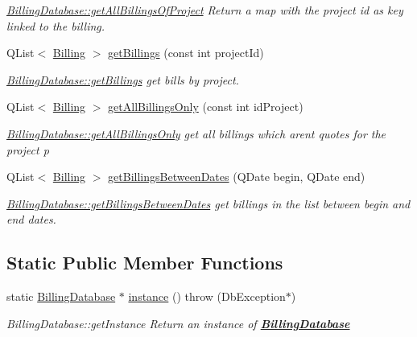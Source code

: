 \begin{DoxyCompactItemize}
\begin{DoxyCompactList}\small\item\em \hyperlink{classDatabases_1_1BillingDatabase_a44c3e09fbb7d540579f4cceae4d6901f}{Billing\+Database\+::get\+All\+Billings\+Of\+Project} Return a map with the project id as key linked to the billing. \end{DoxyCompactList}\item 
Q\+List$<$ \hyperlink{classModels_1_1Billing}{Billing} $>$ \hyperlink{classDatabases_1_1BillingDatabase_a0eb72e4dfee0ff38f2f4b795a16007c8}{get\+Billings} (const int project\+Id)
\begin{DoxyCompactList}\small\item\em \hyperlink{classDatabases_1_1BillingDatabase_a0eb72e4dfee0ff38f2f4b795a16007c8}{Billing\+Database\+::get\+Billings} get bills by project. \end{DoxyCompactList}\item 
Q\+List$<$ \hyperlink{classModels_1_1Billing}{Billing} $>$ \hyperlink{classDatabases_1_1BillingDatabase_ac42335646086c24b2adb6afc2829e07c}{get\+All\+Billings\+Only} (const int id\+Project)
\begin{DoxyCompactList}\small\item\em \hyperlink{classDatabases_1_1BillingDatabase_ac42335646086c24b2adb6afc2829e07c}{Billing\+Database\+::get\+All\+Billings\+Only} get all billings which aren\textquotesingle{}t quotes for the project {\itshape p} \end{DoxyCompactList}\item 
Q\+List$<$ \hyperlink{classModels_1_1Billing}{Billing} $>$ \hyperlink{classDatabases_1_1BillingDatabase_a062336da6fc0e3c7af4396fccd4025ee}{get\+Billings\+Between\+Dates} (Q\+Date begin, Q\+Date end)
\begin{DoxyCompactList}\small\item\em \hyperlink{classDatabases_1_1BillingDatabase_a062336da6fc0e3c7af4396fccd4025ee}{Billing\+Database\+::get\+Billings\+Between\+Dates} get billings in the list between {\itshape begin} and {\itshape end} dates. \end{DoxyCompactList}\end{DoxyCompactItemize}
\subsection*{Static Public Member Functions}
\begin{DoxyCompactItemize}
\item 
static \hyperlink{classDatabases_1_1BillingDatabase}{Billing\+Database} $\ast$ \hyperlink{classDatabases_1_1BillingDatabase_aee84d7d07ff4a25251c61030019e5abb}{instance} ()  throw (\+Db\+Exception$\ast$)
\begin{DoxyCompactList}\small\item\em Billing\+Database\+::get\+Instance Return an instance of {\bfseries \hyperlink{classDatabases_1_1BillingDatabase}{Billing\+Database}} \end{DoxyCompactList}\end{DoxyCompactItemize}

